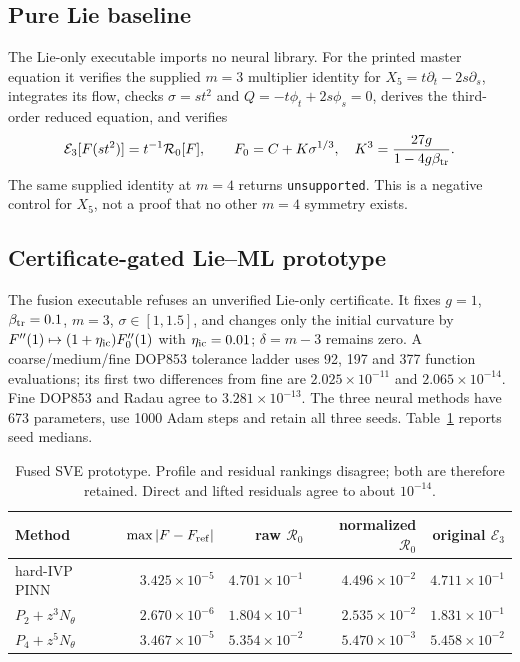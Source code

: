 \documentclass[11pt]{article}
\newcommand{\E}{\mathcal E}
\begin{document}
\subsection{Pure Lie baseline}
The Lie-only executable imports no neural library. For the printed master
equation it verifies the supplied $m=3$ multiplier identity for
$X_5=t\partial_t-2s\partial_s$, integrates its flow, checks
$\sigma=st^2$ and $Q=-t\phi_t+2s\phi_s=0$, derives the third-order reduced
equation, and verifies
\[
 \E_3[F(st^2)]=t^{-1}\mathcal R_0[F],\qquad
 F_0=C+K\sigma^{1/3},\quad
 K^3=\frac{27g}{1-4g\beta_{\rm tr}}.
\]
The same supplied identity at $m=4$ returns \texttt{unsupported}. This is a
negative control for $X_5$, not a proof that no other $m=4$ symmetry exists.

\subsection{Certificate-gated Lie--ML prototype}
The fusion executable refuses an unverified Lie-only certificate. It fixes
$g=1$, $\beta_{\rm tr}=0.1$, $m=3$, $\sigma\in[1,1.5]$, and changes only
the initial curvature by
$F''(1)\mapsto(1+\eta_{\rm ic})F_0''(1)$ with $\eta_{\rm ic}=0.01$;
$\delta=m-3$ remains zero. A coarse/medium/fine DOP853 tolerance ladder uses
92, 197 and 377 function evaluations; its first two differences from fine are
$2.025\times10^{-11}$ and $2.065\times10^{-14}$. Fine DOP853 and Radau agree
to $3.281\times10^{-13}$.
The three neural methods have 673 parameters, use 1000 Adam steps and retain
all three seeds. Table~\ref{tab:fusion} reports seed medians.
\begin{table}[htbp]
\centering\small
\begin{tabular}{@{}lrrrr@{}}
\toprule
Method & $\max|F-F_{\rm ref}|$ & raw $\mathcal R_0$ & normalized
 $\mathcal R_0$ & original $\E_3$ \\
\midrule
hard-IVP PINN & $3.425\times10^{-5}$ & $4.701\times10^{-1}$ & $4.496\times10^{-2}$ & $4.711\times10^{-1}$ \\
$P_2+z^3N_\theta$ & $2.670\times10^{-6}$ & $1.804\times10^{-1}$ & $2.535\times10^{-2}$ & $1.831\times10^{-1}$ \\
$P_4+z^5N_\theta$ & $3.467\times10^{-5}$ & $5.354\times10^{-2}$ & $5.470\times10^{-3}$ & $5.458\times10^{-2}$ \\
\bottomrule
\end{tabular}
\caption{Fused SVE prototype. Profile and residual rankings disagree; both
are therefore retained. Direct and lifted residuals agree to about $10^{-14}$.}
\label{tab:fusion}
\end{table}
\end{document}
